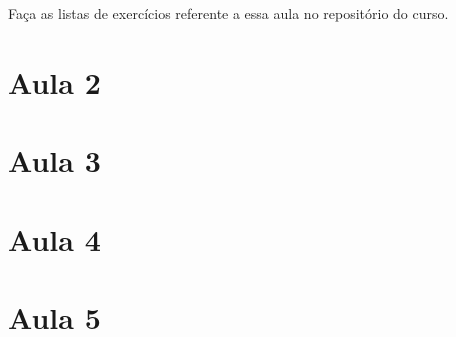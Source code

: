 \documentclass[]{book}
\theoremstyle{definition}
\theoremstyle{definition}
\theoremstyle{definition}
\theoremstyle{remark}
\begin{document}
Faça as listas de exercícios referente a essa aula no repositório do curso.

\hypertarget{aula-2}{%
\chapter{Aula 2}\label{aula-2}}

\hypertarget{aula-3}{%
\chapter{Aula 3}\label{aula-3}}

\hypertarget{aula-4}{%
\chapter{Aula 4}\label{aula-4}}

\hypertarget{aula-5}{%
\chapter{Aula 5}\label{aula-5}}


\end{document}
